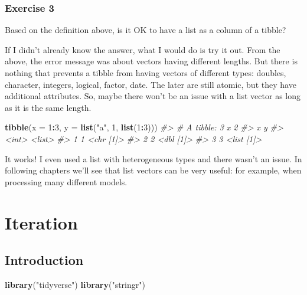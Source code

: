 \documentclass[]{book}
\newenvironment{Shaded}{\begin{snugshade}}{\end{snugshade}}
\newcommand{\CommentTok}[1]{\textcolor[rgb]{0.56,0.35,0.01}{\textit{#1}}}
\newcommand{\DataTypeTok}[1]{\textcolor[rgb]{0.13,0.29,0.53}{#1}}
\newcommand{\DecValTok}[1]{\textcolor[rgb]{0.00,0.00,0.81}{#1}}
\newcommand{\KeywordTok}[1]{\textcolor[rgb]{0.13,0.29,0.53}{\textbf{#1}}}
\newcommand{\NormalTok}[1]{#1}
\newcommand{\OperatorTok}[1]{\textcolor[rgb]{0.81,0.36,0.00}{\textbf{#1}}}
\newcommand{\StringTok}[1]{\textcolor[rgb]{0.31,0.60,0.02}{#1}}
\theoremstyle{plain}
\theoremstyle{remark}
\theoremstyle{definition}
\theoremstyle{definition}
\theoremstyle{definition}
\theoremstyle{remark}
\begin{document}
\hypertarget{exercise-3-43}{%
\subsection{Exercise 3}\label{exercise-3-43}}

Based on the definition above, is it OK to have a list as a column of a
tibble?

If I didn't already know the answer, what I would do is try it out. From
the above, the error message was about vectors having different lengths.
But there is nothing that prevents a tibble from having vectors of
different types: doubles, character, integers, logical, factor, date.
The later are still atomic, but they have additional attributes. So,
maybe there won't be an issue with a list vector as long as it is the
same length.

\begin{Shaded}
\begin{Highlighting}[]
\KeywordTok{tibble}\NormalTok{(}\DataTypeTok{x =} \DecValTok{1}\OperatorTok{:}\DecValTok{3}\NormalTok{, }\DataTypeTok{y =} \KeywordTok{list}\NormalTok{(}\StringTok{"a"}\NormalTok{, }\DecValTok{1}\NormalTok{, }\KeywordTok{list}\NormalTok{(}\DecValTok{1}\OperatorTok{:}\DecValTok{3}\NormalTok{)))}
\CommentTok{#> # A tibble: 3 x 2}
\CommentTok{#>       x y         }
\CommentTok{#>   <int> <list>    }
\CommentTok{#> 1     1 <chr [1]> }
\CommentTok{#> 2     2 <dbl [1]> }
\CommentTok{#> 3     3 <list [1]>}
\end{Highlighting}
\end{Shaded}

It works! I even used a list with heterogeneous types and there wasn't
an issue. In following chapters we'll see that list vectors can be very
useful: for example, when processing many different models.

\hypertarget{iteration}{%
\chapter{Iteration}\label{iteration}}

\hypertarget{introduction-14}{%
\section{Introduction}\label{introduction-14}}

\begin{Shaded}
\begin{Highlighting}[]
\KeywordTok{library}\NormalTok{(}\StringTok{"tidyverse"}\NormalTok{)}
\KeywordTok{library}\NormalTok{(}\StringTok{"stringr"}\NormalTok{)}
\end{Highlighting}
\end{Shaded}
\end{document}
